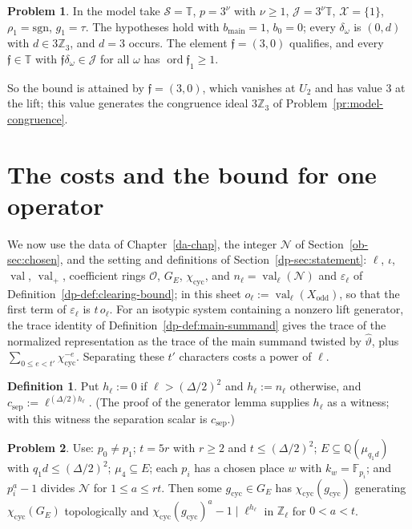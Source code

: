 \documentclass[reqno]{amsart}
\newcounter{chap}
\theoremstyle{definition}
\newtheorem{problem}{Problem}[section]
\newtheorem{definition}{Definition}[section]
\theoremstyle{plain}
\newcommand{\Z}{\mathbb{Z}}
\newcommand{\Q}{\mathbb{Q}}
\newcommand{\F}{\mathbb{F}}
\newcommand{\Oc}{\mathcal{O}}
\newcommand{\val}{\operatorname{val}}
\newcommand{\ord}{\operatorname{ord}}
\newcommand{\cyc}{\chi_{\mathrm{cyc}}}
\newcommand{\sep}{c_{\mathrm{sep}}}
\newcommand{\Tb}{\mathbb{T}}
\newcommand{\half}{(\Delta/2)}
\begin{document}
\begin{problem}\label{pr:model-element}
In the model take \(\mathcal S = \Tb\), \(p = 3^\nu\) with \(\nu \ge 1\), \(\mathcal J = 3^\nu\Tb\), \(\mathcal X = \{1\}\), \(\rho_1 = \mathrm{sgn}\), \(g_1 = \tau\).  The hypotheses hold with \(b_{\mathrm{main}} = 1\), \(b_0 = 0\); every \(\delta_\omega\) is \((0, d)\) with \(d \in 3\Z_3\), and \(d = 3\) occurs.  The element \(\mathfrak f = (3, 0)\) qualifies, and every \(\mathfrak f \in \Tb\) with \(\mathfrak f\delta_\omega \in \mathcal J\) for all \(\omega\) has \(\ord \mathfrak f_1 \ge 1\).
\end{problem}

So the bound is attained by \(\mathfrak f = (3, 0)\), which vanishes at \(U_2\) and has value \(3\) at the lift; this value generates the congruence ideal \(3\Z_3\) of Problem~\ref{pr:model-congruence}.

\section{The costs and the bound for one operator}\label{sec:costs}

We now use the data of Chapter~\ref{da-chap}, the integer \(\mathcal N\) of Section~\ref{ob-sec:chosen}, and the setting and definitions of Section~\ref{dp-sec:statement}: \(\ell\), \(\iota\), \(\val\), \(\val_+\), coefficient rings \(\Oc\), \(G_E\), \(\cyc\), and \(n_\ell = \val_\ell(\mathcal N)\) and \(\varepsilon_\ell\) of Definition~\ref{dp-def:clearing-bound}; in this sheet \(o_\ell := \val_\ell(X_{\mathrm{odd}})\), so that the first term of \(\varepsilon_\ell\) is \(t\,o_\ell\).  For an isotypic system containing a nonzero lift generator, the trace identity of Definition~\ref{dp-def:main-summand} gives the trace of the normalized representation as the trace of the main summand twisted by \(\hat\vartheta\), plus \(\sum_{0 \le e < t'}\cyc^{-e}\).  Separating these \(t'\) characters costs a power of \(\ell\).

\begin{definition}\label{def:sep}
Put \(h_\ell := 0\) if \(\ell > \half^2\) and \(h_\ell := n_\ell\) otherwise, and \(\sep := \ell^{\half h_\ell}\).  (The proof of the generator lemma supplies \(h_\ell\) as a witness; with this witness the separation scalar is \(\sep\).)
\end{definition}

\begin{problem}\label{pr:generator-sep}
Use: \(p_0 \ne p_1\); \(t = 5r\) with \(r \ge 2\) and \(t \le \half^2\); \(E \subseteq \Q(\mu_{q_1d})\) with \(q_1d \le \half^2\); \(\mu_4 \subseteq E\); each \(p_i\) has a chosen place \(w\) with \(k_w = \F_{p_i}\); and \(p_i^a - 1\) divides \(\mathcal N\) for \(1 \le a \le rt\).  Then some \(g_{\mathrm{cyc}} \in G_E\) has \(\cyc(g_{\mathrm{cyc}})\) generating \(\cyc(G_E)\) topologically and \(\cyc(g_{\mathrm{cyc}})^a - 1 \mid \ell^{h_\ell}\) in \(\Z_\ell\) for \(0 < a < t\).
\end{problem}
\end{document}
